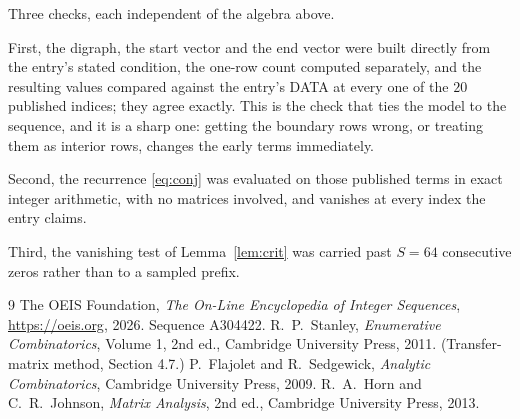 \documentclass[11pt,a4paper]{article}
\theoremstyle{plain}
\theoremstyle{definition}
\begin{document}
Three checks, each independent of the algebra above.

First, the digraph, the start vector and the end vector were built directly from the
entry's stated condition, the one-row count computed separately, and the resulting values
compared against the entry's DATA at every one of the $20$ published indices; they
agree exactly. This is the check that ties the model to the sequence, and it is a sharp one:
getting the boundary rows wrong, or treating them as interior rows, changes the early terms
immediately.

Second, the recurrence \eqref{eq:conj} was evaluated on those published terms in exact
integer arithmetic, with no matrices involved, and vanishes at every index the entry claims.

Third, the vanishing test of Lemma~\ref{lem:crit} was carried past $S=64$ consecutive
zeros rather than to a sampled prefix.

\begin{thebibliography}{9}
 The OEIS Foundation, \emph{The On-Line Encyclopedia of Integer
Sequences}, \url{https://oeis.org}, 2026. Sequence A304422.
 R.~P.~Stanley, \emph{Enumerative Combinatorics}, Volume 1, 2nd ed.,
Cambridge University Press, 2011. (Transfer-matrix method, Section 4.7.)
 P.~Flajolet and R.~Sedgewick, \emph{Analytic Combinatorics}, Cambridge
University Press, 2009.
 R.~A.~Horn and C.~R.~Johnson, \emph{Matrix Analysis}, 2nd ed., Cambridge
University Press, 2013.
\end{thebibliography}
\end{document}
